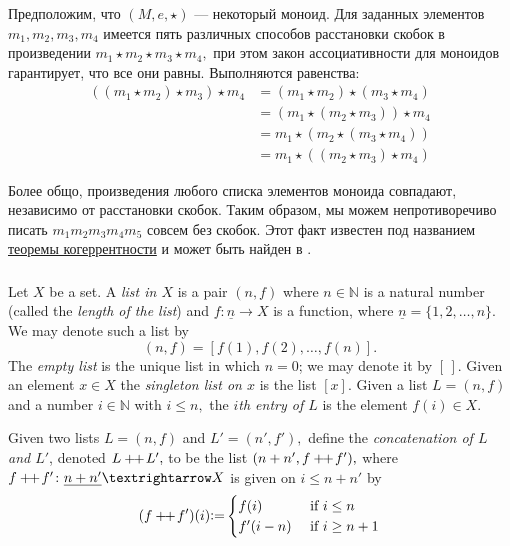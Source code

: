 \documentclass[../main/CT4S-EN-RU]{subfiles}
\begin{document}
\begin{exampleRUS}
Предположим, что $(M,e,{⋆})$ — некоторый моноид. Для заданных элементов $m_1,m_2,m_3,m_4$ имеется пять различных способов расстановки скобок в произведении $m_1{⋆} m_2{⋆} m_3{⋆} m_4,$ при этом закон ассоциативности для моноидов гарантирует, что все они равны. Выполняются равенства:
\begin{align*}
((m_1{⋆} m_2){⋆} m_3){⋆} m_4&=(m_1{⋆} m_2){⋆} (m_3{⋆} m_4)\\
&=(m_1{⋆}(m_2{⋆} m_3)){⋆} m_4\\
&=m_1{⋆}(m_2{⋆} (m_3{⋆} m_4))\\
&=m_1{⋆}((m_2{⋆} m_3){⋆} m_4)
\end{align*}

Более общо, произведения любого списка элементов моноида совпадают, независимо от расстановки скобок. Таким образом, мы можем непротиворечиво писать $m_1m_2m_3m_4m_5$ совсем без скобок. Этот факт известен под названием \href{http://en.wikipedia.org/wiki/Coherence_theorem}{\text теоремы когеррентности} и может быть найден в \cite{Mac}.
\end{exampleRUS}


\subsubsection{}\label{sec:free monoid}

\begin{definitionENG}\label{def:list}
Let $X$ be a set. A {\em list in $X$} is a pair $(n,f)$ where $n\in{ℕ}$ is a natural number (called the {\em length of the list}) and $f\colon\underline{n}{→} X$ is a function, where $\underline{n}=\{1,2,\ldots,n\}.$ We may denote such a list by
$$(n,f)=[f(1),f(2),\ldots,f(n)].$$
The {\em empty list} is the unique list in which $n=0$; we may denote it by $[\,].$ Given an element $x\in X$ the {\em singleton list on $x$} is the list $[x].$ Given a list $L=(n,f)$ and a number $i\in{ℕ}$ with $i\leq n,$ the {\em $i$th entry of $L$} is the element $f(i)\in X.$ 

Given two lists $L=(n,f)$ and $L'=(n',f'),$ define the {\em concatenation of $L$ and $L'$}, denoted $L+\!\!+\hspace{1pt} L',$ to be the list $(n+n',f+\!\!+\hspace{1pt} f'),$ where $f\plpl f'\colon \underline{n+n'}{→} X$ is given on $i\leq n+n'$ by
$$(f+\!\!+\hspace{1pt} f')(i){\mathrel{\mathop:}=}
\begin{cases}
f(i)&\textnormal{ if }i\leq n\\
f'(i-n)&\textnormal{ if }i\geq n+1
\end{cases}
$$
\end{definitionENG}
\end{document}
